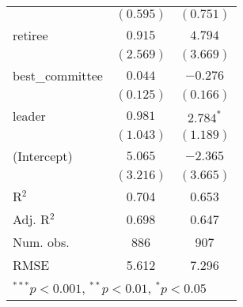 \documentclass[12pt]{article}
\begin{document}
\begin{table}
\begin{center}
\begin{tabular}{l c c }
			& $(0.595)$      & $(0.751)$     \\
			retiree                  & $0.915$        & $4.794$       \\
			& $(2.569)$      & $(3.669)$     \\
			best\_committee          & $0.044$        & $-0.276$      \\
			& $(0.125)$      & $(0.166)$     \\
			leader                   & $0.981$        & $2.784^{*}$   \\
			& $(1.043)$      & $(1.189)$     \\
			(Intercept)              & $5.065$        & $-2.365$      \\
			& $(3.216)$      & $(3.665)$     \\
			\hline
			R$^2$                    & 0.704          & 0.653         \\
			Adj. R$^2$               & 0.698          & 0.647         \\
			Num. obs.                & 886            & 907           \\
			RMSE                     & 5.612          & 7.296         \\
			\hline
			\multicolumn{3}{l}{\scriptsize{$^{***}p<0.001$, $^{**}p<0.01$, $^*p<0.05$}}
		\end{tabular}
	\end{center}
\end{table}
\end{document}
